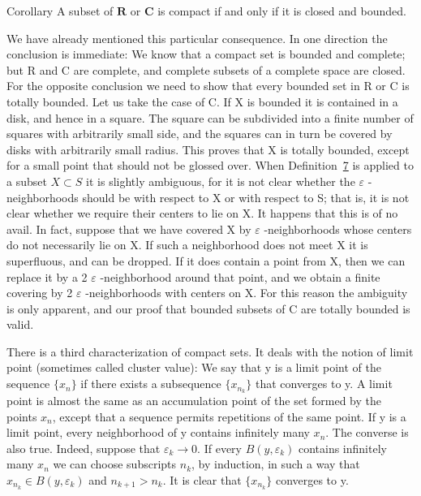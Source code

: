 \begin{originalstatement}{Corollary}{}\label{cor:3.unnumbered-p77-b1}
A subset of $\mathbf{R}$ or $\mathbf{C}$ is compact if and only if it is closed and bounded.
\end{originalstatement}
We have already mentioned this particular consequence. In one direction the conclusion is immediate: We know that a compact set is bounded and complete; but R and C are complete, and complete subsets of a complete space are closed. For the opposite conclusion we need to show that every bounded set in R or C is totally bounded. Let us take the case of C. If X is bounded it is contained in a disk, and hence in a square. The square can be subdivided into a finite number of squares with arbitrarily small side, and the squares can in turn be covered by disks with arbitrarily small radius. This proves that X is totally bounded, except for a small point that should not be glossed over. When Definition~\hyperref[def:3.7]{7} is applied to a subset $X \subset S$ it is slightly ambiguous, for it is not clear whether the $\varepsilon$ -neighborhoods should be with respect to X or with respect to S; that is, it is not clear whether we require their centers to lie on X. It happens that this is of no avail. In fact, suppose that we have covered X by $\varepsilon$ -neighborhoods whose centers do not necessarily lie on X. If such a neighborhood does not meet X it is superfluous, and can be dropped. If it does contain a point from X, then we can replace it by a 2 $\varepsilon$ -neighborhood around that point, and we obtain a finite covering by 2 $\varepsilon$ -neighborhoods with centers on X. For this reason the ambiguity is only apparent, and our proof that bounded subsets of C are totally bounded is valid.

\begingroup\renewcommand{\thefootnote}{}\endgroup

There is a third characterization of compact sets. It deals with the notion of limit point (sometimes called cluster value): We say that y is a limit point of the sequence $\{x_{n}\}$ if there exists a subsequence $\{x_{n_{k}}\}$ that converges to y. A limit point is almost the same as an accumulation point of the set formed by the points $x_{n}$, except that a sequence permits repetitions of the same point. If y is a limit point, every neighborhood of y contains infinitely many $x_{n}$. The converse is also true. Indeed, suppose that $\varepsilon_{k} \to 0$. If every $B(y, \varepsilon_{k})$ contains infinitely many $x_{n}$ we can choose subscripts $n_{k}$, by induction, in such a way that $x_{n_{k}} \in B(y, \varepsilon_{k})$ and $n_{k+1} > n_{k}$. It is clear that $\{x_{n_{k}}\}$ converges to y.


